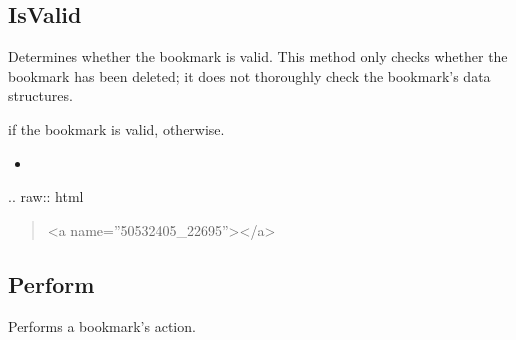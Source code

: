\documentclass[letterpaper,12pt,english,openany,oneside]{sphinxmanual}
\begin{document}
\subsection{IsValid}
\label{\detokenize{IAC_API_OLE_Objects:isvalid-2}}\label{\detokenize{IAC_API_OLE_Objects:id13}}
Determines whether the bookmark is valid. This method only checks whether the bookmark has been deleted; it does not thoroughly check the bookmark’s data structures.


\begin{sphinxVerbatim}[commandchars=\\\{\}]
 
\end{sphinxVerbatim}


 if the bookmark is valid,  otherwise.

\label{\detokenize{IAC_API_OLE_Objects:related-methods-85}}
\begin{itemize}
\item {} 
 

\end{itemize}

 .. raw:: html
\begin{quote}

<a name=”50532405\_22695”></a>
\end{quote}


\subsection{Perform}
\label{\detokenize{IAC_API_OLE_Objects:perform-1}}\label{\detokenize{IAC_API_OLE_Objects:id14}}
Performs a bookmark’s action.


\begin{sphinxVerbatim}[commandchars=\\\{\}]
  
\end{sphinxVerbatim}
\label{\detokenize{IAC_API_OLE_Objects:parameters-48}}
\end{document}
